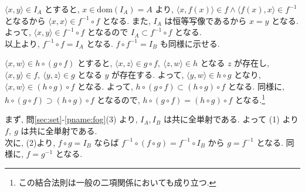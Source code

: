 \begin{nmprob}
{$\langle x, y\rangle \in I_A$ とすると, $x \in \text{dom}(I_A) = A$ より, $\langle x, f(x)\rangle \in f \land \langle f(x), x\rangle \in f^{-1}$ となるから $\langle x, x\rangle \in f^{-1}\circ f$ となる.
また, $I_A$ は恒等写像であるから $x = y$ となる. よって, $\langle x, y\rangle \in f^{-1}\circ f$ となるので $I_A \subset f^{-1}\circ f$ となる.\\
以上より, $f^{-1}\circ f = I_A$ となる. $f\circ f^{-1} = I_B$ も同様に示せる.
\item
$\langle x, w\rangle \in h\circ (g\circ f)$ とすると, $\langle x, z\rangle \in g \circ f,\ \langle z, w\rangle \in h$ となる $z$ が存在し,
$\langle x, y\rangle \in f,\ \langle y, z\rangle \in g$ となる $y$ が存在する. よって, $\langle y, w\rangle \in h\circ g$ となり,
$\langle x, w\rangle \in (h \circ g) \circ f$ となる. よって, $h \circ (g \circ f) \subset (h \circ g)\circ f$ となる.
同様に, $h \circ (g \circ f) \supset (h \circ g)\circ f$ となるので, $h \circ (g \circ f) = (h \circ g)\circ f$ となる.\footnote[1]{この結合法則は一般の二項関係においても成り立つ.}
\item まず, 問\ref{sec:set}-\ref{pname:fog}(3) より, $I_A, I_B$ は共に全単射である. よって (1) より $f,\ g$ は共に全単射である.\\
次に, (2)より, $f\circ g = I_B$ ならば $f^{-1}\circ (f\circ g) = f^{-1}\circ I_B$ から $g = f^{-1}$ となる. 同様に, $f = g^{-1}$ となる.
}
\end{nmprob}



